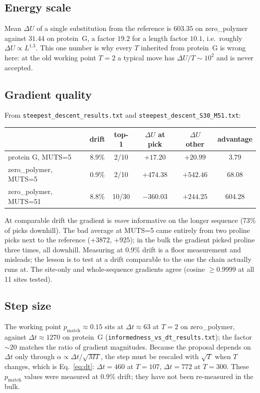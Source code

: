 \documentclass[11pt,a4paper]{article}
\newcommand{\dt}{\Delta t}
\newcommand{\Mass}{M}
\newcommand{\file}[1]{\texttt{#1}}
\begin{document}
\subsection{Energy scale}
Mean $\Delta U$ of a single substitution from the reference is $603.35$ on
zero\_polymer against $31.44$ on protein~G, a factor $19.2$ for a length factor
$10.1$, i.e.\ roughly $\Delta U\propto L^{1.3}$. This one number is why every
$T$ inherited from protein~G is wrong here: at the old working point $T=2$ a
typical move has $\Delta U/T\sim 10^2$ and is never accepted.

\subsection{Gradient quality}
From \file{steepest\_descent\_results.txt} and
\file{steepest\_descent\_S30\_M51.txt}:
\begin{center}
\begin{tabular}{@{}lccccc@{}}
\toprule
 & drift & top-1 & $\Delta U$ at pick & $\Delta U$ other & advantage \\
\midrule
protein G, MUTS=5     & 8.9\% & 2/10  & $+17.20$  & $+20.99$  & 3.79 \\
zero\_polymer, MUTS=5 & 0.9\% & 2/10  & $+474.38$ & $+542.46$ & 68.08 \\
zero\_polymer, MUTS=51 & 8.8\% & 10/30 & $-360.03$ & $+244.25$ & 604.28 \\
\bottomrule
\end{tabular}
\end{center}
At comparable drift the gradient is \emph{more} informative on the longer
sequence (73\% of picks downhill). The bad average at MUTS=5 came entirely from
two proline picks next to the reference ($+3872$, $+925$); in the bulk the
gradient picked proline three times, all downhill. Measuring at 0.9\% drift is a
floor measurement and misleads; the lesson is to test at a drift comparable to
the one the chain actually runs at. The site-only and whole-sequence gradients
agree (cosine $\ge0.9999$ at all 11 sites tested).

\subsection{Step size}\label{sec:dt}
The working point $p_{\mathrm{match}}\approx0.15$ sits at $\dt\approx63$ at $T=2$
on zero\_polymer, against $\dt\approx1270$ on protein~G
(\file{informedness\_vs\_dt\_results.txt}); the factor $\sim20$ matches the ratio of
gradient magnitudes. Because the proposal depends on $\dt$ only through
$\alpha\propto\dt/\sqrt{\Mass T}$, the step must be rescaled with $\sqrt{T}$ when
$T$ changes, which is Eq.~\eqref{eq:dt}: $\dt=460$ at $T=107$, $\dt=772$ at
$T=300$. These $p_{\mathrm{match}}$ values were measured at 0.9\% drift; they
have not been re-measured in the bulk.
\end{document}
